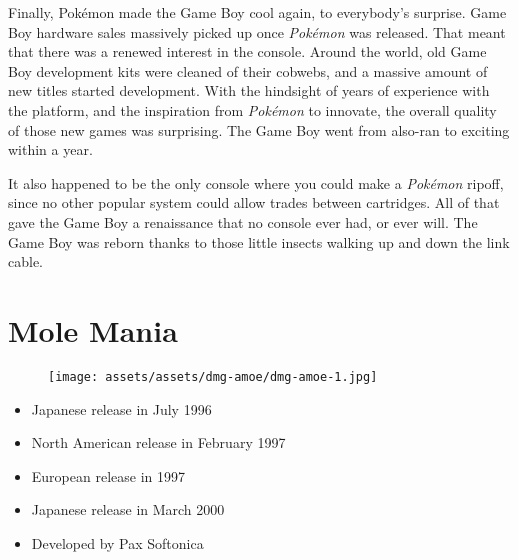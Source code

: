 \documentclass{book}
\begin{document}
Finally, Pokémon made the Game Boy cool again, to everybody’s surprise. Game Boy hardware sales massively picked up once \emph{Pokémon} was released. That meant that there was a renewed interest in the console. Around the world, old Game Boy development kits were cleaned of their cobwebs, and a massive amount of new titles started development. With the hindsight of years of experience with the platform, and the inspiration from \emph{Pokémon} to innovate, the overall quality of those new games was surprising. The Game Boy went from also-ran to exciting within a year.

It also happened to be the only console where you could make a \emph{Pokémon} ripoff, since no other popular system could allow trades between cartridges. All of that gave the Game Boy a renaissance that no console ever had, or ever will. The Game Boy was reborn thanks to those little insects walking up and down the link cable.



\begingroup \chapter*{Mole Mania} \endgroup
\begin{figure}[H]
\vskip 4pt
\centering
\texttt{[image: assets/assets/dmg-amoe/dmg-amoe-1.jpg]}\end{figure}
\begin{itemize} [nosep]




\item Japanese release in July 1996







\item North American release in February 1997







\item European release in 1997







\item Japanese release in March 2000
































\item Developed by Pax Softonica

\end{itemize}\noindent
\end{document}
